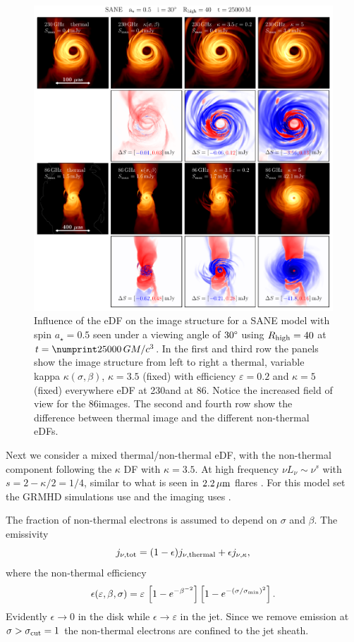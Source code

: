 \begin{figure}
  \centering
  \includegraphics[width=\textwidth]{./figures/SANE_eDFs_diff.pdf}
  \caption{Influence of the eDF on the image structure for a SANE model with spin $a_{\star}=0.5$ seen under a viewing angle of $30\degree$ using $R_\mathrm{high} = 40$ at $t = \no{25000}\,\tg$.
    In the first and third row the panels show the image structure from left to right a thermal, variable kappa $\kappa(\sigma,\beta)$, $\kappa=3.5$ (fixed) with efficiency $\varepsilon=0.2$ and $\kappa=5$ (fixed) everywhere eDF at 230\GHz and at 86\GHz.
    Notice the increased field of view for the 86\GHz images.
    The second and fourth row show the difference between thermal image and the different non-thermal eDFs.}
  \label{fig:SANE_edfs}
\end{figure}

Next we consider a mixed thermal/non-thermal eDF, with the non-thermal component following the $\kappa$ DF with $\kappa = 3.5$.
At high frequency $\nu L_\nu \sim \nu^s$ with $s = 2 - \kappa/2 = 1/4$, similar to what is seen in $2.2\,\mu\mathrm{m}$ flares \citep{2007ApJ...667..900H}.
For this model set the GRMHD simulations use \bhac and the imaging uses \bhoss.

The fraction of non-thermal electrons is assumed to depend on $\sigma$ and $\beta$.  The emissivity
\begin{equation}
  j_{\nu,\rm{tot}}=(1-\epsilon) j_{\nu,\rm{thermal}} + \epsilon j_{\nu, \kappa},
  \label{eq:kappaeff}
\end{equation}
where the non-thermal efficiency 
\begin{equation}
  \epsilon(\varepsilon,\beta,\sigma)=\varepsilon\,
  \left[1 - e^{-\beta^{-2}}\right]
  \left[1-e^{-(\sigma/\sigma_{\rm min})^2}\right].
  \label{eq:efficiencybetasigma}
\end{equation}
Evidently $\epsilon \rightarrow 0$ in the disk while $\epsilon \rightarrow \varepsilon$ in the jet.
Since we remove emission at $\sigma > \sigma_{\rm cut} = 1$ the non-thermal electrons are confined to the jet sheath.

